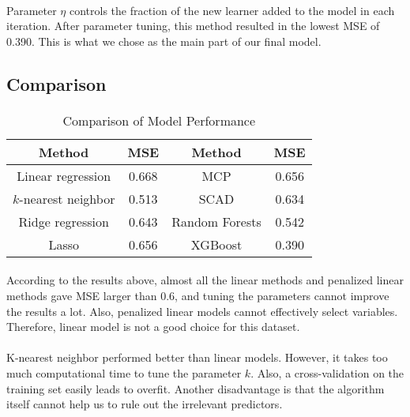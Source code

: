 \documentclass[paper=a4, fontsize=11pt]{scrartcl} %
\numberwithin{equation}{section} %
\numberwithin{figure}{section} %
\numberwithin{table}{section} %
\begin{document}
{\paragraph{}
Parameter \(\eta\) controls the fraction of the new learner added to the model in each iteration. After parameter tuning, this method resulted in the lowest MSE of 0.390. This is what we chose as the main part of our final model.

\subsection{Comparison}
\paragraph{}
\begin{table}[ht]
\caption{Comparison of Model Performance} %
\centering %
\small
\begin{tabular}{c c || c c} %

\hline %
Method & MSE & Method & MSE\\ [.5ex]
\hline
Linear regression & 0.668 & MCP & 0.656\\
\hline
\(k\)-nearest neighbor & 0.513 & SCAD & 0.634\\
\hline
Ridge regression & 0.643 & Random Forests & 0.542\\
\hline
Lasso & 0.656 & XGBoost & 0.390 \\ [1ex]
\hline %
\end{tabular}
\end{table}

\paragraph{}
According to the results above, almost all the linear methods and penalized linear methods gave MSE larger than 0.6, and tuning the parameters cannot improve the results a lot. Also, penalized linear models cannot effectively select variables. Therefore, linear model is not a good choice for this dataset.
\paragraph{}
K-nearest neighbor performed better than linear models. However, it takes too much computational time to tune the parameter \(k\). Also, a cross-validation on the training set easily leads to overfit. Another disadvantage is that the algorithm itself cannot help us to rule out the irrelevant predictors.
}
\end{document}

